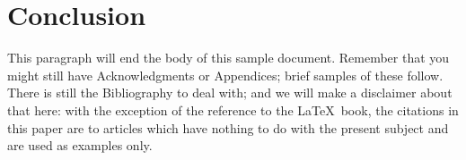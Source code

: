 
\section{Conclusion}
\label{sec:conclusion}
This paragraph will end the body of this sample document. Remember that you might still have Acknowledgments or Appendices; brief samples of these follow.  There is still the Bibliography to deal with; and we will make a disclaimer about that here: with the exception of the reference to the \LaTeX\ book, the citations in this paper are to articles which have nothing to do with the present subject and are used as examples only.
